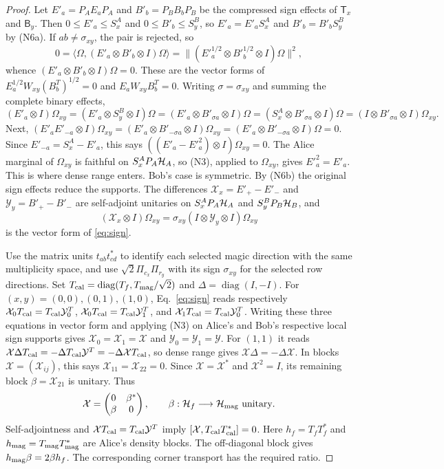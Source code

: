 \begin{proof}
Let $E'_a=P_AE_aP_A$ and $B'_b=P_BB_bP_B$ be the compressed sign effects of $\mathsf T_x$ and $\mathsf B_y$. Then $0\leq E'_a\leq S^A_x$ and $0\leq B'_b\leq S^B_y$, so $E'_a=E'_aS^A_x$ and $B'_b=B'_bS^B_y$ by (N6a). If $ab\ne\sigma_{xy}$, the pair is rejected, so
\[
 0=\langle\Omega,(E'_a\otimes B'_b\otimes I)\Omega\rangle=\|(E'^{1/2}_a\otimes B'^{1/2}_b\otimes I)\Omega\|^2,
\]
whence $(E'_a\otimes B'_b\otimes I)\Omega=0$. These are the vector forms of $E_a^{1/2}W_{xy}(B_b^T)^{1/2}=0$ and $E_aW_{xy}B_b^T=0$. Writing $\sigma=\sigma_{xy}$ and summing the complete binary effects,
\[
 (E'_a\otimes I)\Omega_{xy}=(E'_a\otimes S^B_y\otimes I)\Omega=(E'_a\otimes B'_{\sigma a}\otimes I)\Omega=(S^A_x\otimes B'_{\sigma a}\otimes I)\Omega=(I\otimes B'_{\sigma a}\otimes I)\Omega_{xy}.
\]
Next, $(E'_aE'_{-a}\otimes I)\Omega_{xy}=(E'_a\otimes B'_{-\sigma a}\otimes I)\Omega_{xy}=(E'_a\otimes B'_{-\sigma a}\otimes I)\Omega=0$. Since $E'_{-a}=S^A_x-E'_a$, this says $((E'_a-E'^2_a)\otimes I)\Omega_{xy}=0$. The Alice marginal of $\Omega_{xy}$ is faithful on $S^A_xP_A\mathcal H_A$, so (N3), applied to $\Omega_{xy}$, gives $E'^2_a=E'_a$. This is where dense range enters. Bob's case is symmetric. By (N6b) the original sign effects reduce the supports. The differences $\mathcal X_x=E'_+-E'_-$ and $\mathcal Y_y=B'_+-B'_-$ are self-adjoint unitaries on $S^A_xP_A\mathcal H_A$ and $S^B_yP_B\mathcal H_B$, and
\[
 (\mathcal X_x\otimes I)\Omega_{xy}=\sigma_{xy}(I\otimes\mathcal Y_y\otimes I)\Omega_{xy}
\]
is the vector form of \eqref{eq:sign}.

Use the matrix units $t_{ab}t_{cd}^*$ to identify each selected
magic direction with the same multiplicity space, and use
$\sqrt2\Pi_{c_x}\Pi_{r_y}$ with its sign $\sigma_{xy}$ for the selected
row directions. Set $T_{\rm cal}=\operatorname{diag}(T_f,T_{\rm mag}/\sqrt2)$ and
$\Delta=\operatorname{diag}(I,-I)$. For $(x,y)=(0,0),(0,1),(1,0)$,
Eq.~\eqref{eq:sign} reads respectively
$\mathcal X_0T_{\rm cal}=T_{\rm cal}\mathcal Y_0^T$, $\mathcal X_0T_{\rm cal}=T_{\rm cal}\mathcal Y_1^T$, and $\mathcal X_1T_{\rm cal}=T_{\rm cal}\mathcal Y_0^T$.
Writing these three equations in vector form and applying (N3)
on Alice's and Bob's respective local sign supports gives
$\mathcal X_0=\mathcal X_1=\mathcal X$ and
$\mathcal Y_0=\mathcal Y_1=\mathcal Y$.
For $(1,1)$ it reads $\mathcal X\Delta T_{\rm cal}=-\Delta T_{\rm cal}\mathcal Y^T=-\Delta\mathcal X T_{\rm cal}$, so dense range gives
$\mathcal X\Delta=-\Delta\mathcal X$. In blocks $\mathcal X=(\mathcal X_{ij})$, this says
$\mathcal X_{11}=\mathcal X_{22}=0$. Since $\mathcal X=\mathcal X^*$ and $\mathcal X^2=I$, its remaining block
$\beta=\mathcal X_{21}$ is unitary. Thus
\[
 \mathcal X=\begin{pmatrix}0&\beta^*\\\beta&0\end{pmatrix},\qquad
 \beta:\mathcal H_f\longrightarrow\mathcal H_{\rm mag}\ \hbox{unitary}.
\]
Self-adjointness and
$\mathcal X T_{\rm cal}=T_{\rm cal}\mathcal Y^T$ imply
$[\mathcal X,T_{\rm cal}T_{\rm cal}^*]=0$.
Here $h_f=T_fT_f^*$ and
$h_{\rm mag}=T_{\rm mag}T_{\rm mag}^*$ are Alice's density blocks.
The off-diagonal block gives
$h_{\rm mag}\beta=2\beta h_f$.
The corresponding corner transport has the required ratio.


\end{proof}
